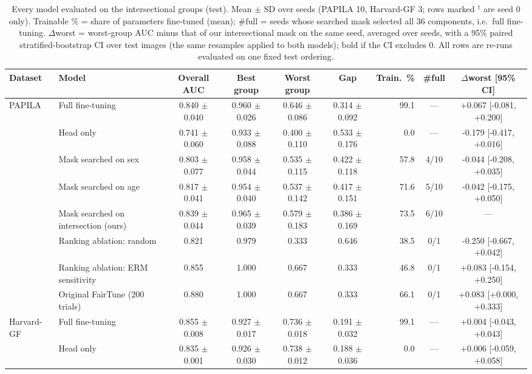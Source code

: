 \begin{table}[t]
\centering
\caption{Every model evaluated on the intersectional groups (test). Mean $\pm$ SD over seeds (PAPILA 10, Harvard-GF 3; rows marked $^\dagger$ are seed 0 only). Trainable \% = share of parameters fine-tuned (mean); \#full = seeds whose searched mask selected all 36 components, i.e.\ full fine-tuning. $\Delta$worst = worst-group AUC minus that of our intersectional mask on the same seed, averaged over seeds, with a 95\% paired stratified-bootstrap CI over test images (the same resamples applied to both models); bold if the CI excludes 0. All rows are re-runs evaluated on one fixed test ordering.}
\label{tab:ablation}
\small
\begin{tabular}{llccccrcc}
\toprule
Dataset & Model & Overall AUC & Best group & Worst group & Gap & Train.\ \% & \#full & $\Delta$worst [95\% CI] \\
\midrule
PAPILA & Full fine-tuning & 0.840 $\pm$ 0.040 & 0.960 $\pm$ 0.026 & 0.646 $\pm$ 0.086 & 0.314 $\pm$ 0.092 & 99.1 & --- & +0.067 [-0.081, +0.200] \\
 & Head only & 0.741 $\pm$ 0.060 & 0.933 $\pm$ 0.088 & 0.400 $\pm$ 0.110 & 0.533 $\pm$ 0.176 & 0.0 & --- & -0.179 [-0.417, +0.016] \\
 & Mask searched on sex & 0.803 $\pm$ 0.077 & 0.958 $\pm$ 0.044 & 0.535 $\pm$ 0.115 & 0.422 $\pm$ 0.118 & 57.8 & 4/10 & -0.044 [-0.208, +0.035] \\
 & Mask searched on age & 0.817 $\pm$ 0.041 & 0.954 $\pm$ 0.040 & 0.537 $\pm$ 0.142 & 0.417 $\pm$ 0.151 & 71.6 & 5/10 & -0.042 [-0.175, +0.050] \\
 & Mask searched on intersection (ours) & 0.839 $\pm$ 0.044 & 0.965 $\pm$ 0.039 & 0.579 $\pm$ 0.183 & 0.386 $\pm$ 0.169 & 73.5 & 6/10 & --- \\
 & Ranking ablation: random & 0.821 & 0.979 & 0.333 & 0.646 & 38.5 & 0/1 & -0.250 [-0.667, +0.042] \\
 & Ranking ablation: ERM sensitivity & 0.855 & 1.000 & 0.667 & 0.333 & 46.8 & 0/1 & +0.083 [-0.154, +0.250] \\
 & Original FairTune (200 trials) & 0.880 & 1.000 & 0.667 & 0.333 & 66.1 & 0/1 & +0.083 [+0.000, +0.333] \\
\midrule
Harvard-GF & Full fine-tuning & 0.855 $\pm$ 0.008 & 0.927 $\pm$ 0.017 & 0.736 $\pm$ 0.018 & 0.191 $\pm$ 0.032 & 99.1 & --- & +0.004 [-0.043, +0.043] \\
 & Head only & 0.835 $\pm$ 0.001 & 0.926 $\pm$ 0.030 & 0.738 $\pm$ 0.012 & 0.188 $\pm$ 0.036 & 0.0 & --- & +0.006 [-0.059, +0.058] \\

\end{tabular}
\end{table}
